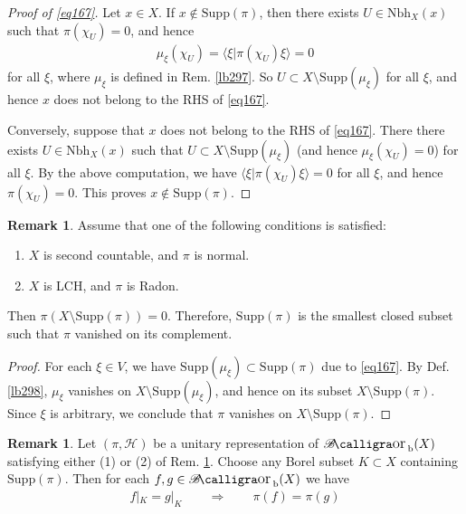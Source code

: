 \documentclass[12pt,b5paper,notitlepage]{article}
\theoremstyle{definition}
\newtheorem{rem}[df]{Remark}
\theoremstyle{plain}
\DeclareMathOperator{\Borb}{{\mathscr{B}\text{\kern -2pt {\calligra\large or}}\,}_{\mathrm b}}
\newcommand{\bk}[1]{\langle {#1}\rangle}
\newcommand{\Supp}{\mathrm{Supp}}
\newcommand{\Nbh}{\mathrm{Nbh}}
\newcommand{\MH}{\mathcal H}
\numberwithin{equation}{section}
\begin{document}
\begin{proof}[Proof of \eqref{eq167}]
Let $x\in X$. If $x\notin\Supp(\pi)$, then there exists $U\in\Nbh_X(x)$ such that $\pi(\chi_U)=0$, and hence
\begin{align*}
\mu_\xi(\chi_U)=\bk{\xi|\pi(\chi_U)\xi}=0
\end{align*}
for all $\xi$, where $\mu_\xi$ is defined in Rem. \ref{lb297}. So $U\subset X\setminus\Supp(\mu_\xi)$ for all $\xi$, and hence $x$ does not belong to the RHS of \eqref{eq167}.

Conversely, suppose that $x$ does not belong to the RHS of \eqref{eq167}. There there exists $U\in\Nbh_X(x)$ such that $U\subset X\setminus\Supp(\mu_\xi)$ (and hence $\mu_\xi(\chi_U)=0$) for all $\xi$. By the above computation, we have $\bk{\xi|\pi(\chi_U)\xi}=0$ for all $\xi$, and hence $\pi(\chi_U)=0$. This proves $x\notin\Supp(\pi)$.
\end{proof}




\begin{rem}\label{lb302}
Assume that one of the following conditions is satisfied:
\begin{enumerate}
\item[(1)] $X$ is second countable, and $\pi$ is normal.
\item[(2)] $X$ is LCH, and $\pi$ is Radon.
\end{enumerate}
Then $\pi(X\setminus\Supp(\pi))=0$. Therefore, $\Supp(\pi)$ is the smallest closed subset such that $\pi$ vanished on its complement.
\end{rem}

\begin{proof}
For each $\xi\in V$, we have $\Supp(\mu_\xi)\subset\Supp(\pi)$ due to \eqref{eq167}. By Def. \ref{lb298}, $\mu_\xi$ vanishes on $X\setminus\Supp(\mu_\xi)$, and hence on its subset $X\setminus\Supp(\pi)$. Since $\xi$ is arbitrary, we conclude that $\pi$ vanishes on $X\setminus\Supp(\pi)$.
\end{proof}


\begin{rem}\label{lb301}
Let $(\pi,\MH)$ be a unitary representation of $\Borb(X)$ satisfying either (1) or (2) of Rem. \ref{lb302}. Choose any Borel subset $K\subset X$ containing $\Supp(\pi)$. Then for each $f,g\in\Borb(X)$ we have
\begin{align*}
f|_K=g|_K\qquad\Longrightarrow\qquad\pi(f)=\pi(g)
\end{align*}
\end{rem}
\end{document}
